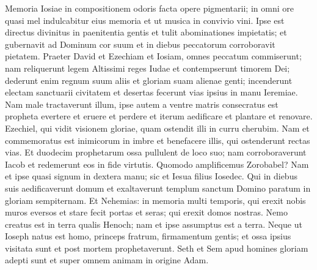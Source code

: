 \begin{biblechapter}  
\verse Memoria Iosiae in compositionem odoris facta opere pigmentarii; 
\verse in omni ore quasi mel indulcabitur eius memoria et ut musica in convivio vini. 
\verse Ipse est directus divinitus in paenitentia gentis et tulit abominationes impietatis; 
\verse et gubernavit ad Dominum cor suum et in diebus peccatorum corroboravit pietatem. 
\verse Praeter David et Ezechiam et Iosiam, omnes peccatum commiserunt; 
\verse nam reliquerunt legem Altissimi reges Iudae et contempserunt timorem Dei; 
\verse dederunt enim regnum suum aliis et gloriam suam alienae genti; 
\verse incenderunt electam sanctuarii civitatem et desertas fecerunt vias ipsius in manu Ieremiae. 
\verse Nam male tractaverunt illum, ipse autem a ventre matris consecratus est propheta evertere et eruere et perdere et iterum aedificare et plantare et renovare. 
\verse Ezechiel, qui vidit visionem gloriae, quam ostendit illi in curru cherubim. 
\verse Nam et commemoratus est inimicorum in imbre et benefacere illis, qui ostenderunt rectas vias. 
\verse Et duodecim prophetarum ossa pullulent de loco suo; nam corroboraverunt Iacob et redemerunt eos in fide virtutis. 
\verse Quomodo amplificemus Zorobabel? Nam et ipse quasi signum in dextera manu; 
\verse sic et Iesua filius Iosedec. Qui in diebus suis aedificaverunt domum et exaltaverunt templum sanctum Domino paratum in gloriam sempiternam. 
\verse Et Nehemias: in memoria multi temporis, qui erexit nobis muros eversos et stare fecit portas et seras; qui erexit domos nostras. 
\verse Nemo creatus est in terra qualis Henoch; nam et ipse assumptus est a terra. 
\verse Neque ut Ioseph natus est homo, princeps fratrum, firmamentum gentis; 
\verse et ossa ipsius visitata sunt et post mortem prophetaverunt. 
\verse Seth et Sem apud homines gloriam adepti sunt et super omnem animam in origine Adam. 
\end{biblechapter}

